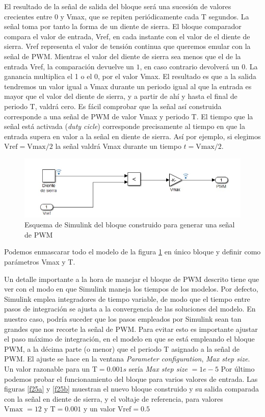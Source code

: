 \documentclass[10pt,a4paper]{report}
\begin{document}
El resultado de la señal de salida del bloque será una sucesión de valores crecientes entre $0$ y Vmax, que se repiten periódicamente cada T segundos. La señal toma por tanto la forma de un diente de sierra. El bloque comparador compara el valor de entrada, Vref,  en cada instante con el valor de el diente de sierra. Vref representa el valor de tensión continua que queremos emular con la señal de PWM. Mientras el valor del diente de sierra sea menos que el de la entrada Vref, la comparación devuelve un $1$, en caso contrario devolverá un $0$. La ganancia multiplica el 1 o el 0, por el valor Vmax. El resultado es que a la salida tendremos un valor igual a Vmax durante un periodo igual al que la entrada es mayor que el valor del diente de sierra, y a partir de ahí y hasta el final de periodo T, valdrá cero. Es fácil comprobar que la señal así construida corresponde a una señal de PWM de valor Vmax y periodo T. El tiempo que la señal está activada (\emph{duty cicle}) corresponde precisamente al tiempo en que la entrada supera en valor a la señal en diente de sierra. Así por ejemplo, si elegimos $\text{Vref} = \text{Vmax}/2$ la señal valdrá Vmax durante un tiempo $t=\text{Vmax}/2$.  
\begin{figure}
\centering
\includegraphics[scale=1]{pwm_gen.jpg}
\caption{Esquema de Simulink del bloque construido para generar una señal de PWM}
\label{f24}
\end{figure}
Podemos enmascarar todo el modelo de la figura \ref{f24} en único bloque y definir como parámetros Vmax y T. 

Un detalle importante a la hora de manejar el bloque de PWM descrito tiene que ver con el modo en que Simulink maneja los tiempos de los modelos. Por defecto, Simulink emplea integradores de tiempo variable, de modo que el tiempo entre pasos de integración se ajusta a la convergencia de las soluciones del modelo. En nuestro caso, podría suceder que los pasos empleados por Simulink sean tan grandes que nos recorte la señal de PWM. Para evitar esto es importante ajustar el paso máximo de integración, en el modelo en que se está empleando el bloque PWM, a la décima parte (o menor) que el periodo T asignado a la señal de PWM. El ajuste se hace en la ventana \emph{Parameter configuration}, \emph{Max step size}. Un valor razonable para un $\text{T} = 0.001s$ sería \emph{Max step size} $=1e-5$  
Por último podemos probar el funcionamiento del bloque para varios valores de entrada. Las figuras \ref{f25a} y \ref{f25b} muestran el nuevo bloque construido y su salida  comparada con la señal en diente de sierra, y el voltaje de referencia, para valores $\text{Vmax }= 12$ y $\text{T} = 0.001$ y un valor $\text{Vref} =0.5$ 
\end{document}
